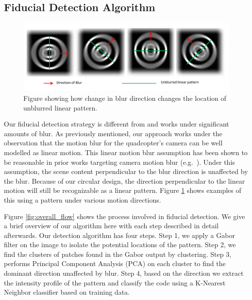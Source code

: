 \documentclass[runningheads]{llncs}
\begin{document}
\subsection{Fiducial Detection Algorithm}

\begin{figure}
\centering
\includegraphics[width=0.8\linewidth]{blur_direction.pdf}
\caption{Figure showing how change in blur direction changes the location of
unblurred linear pattern.}
\label{fig:blur_direction}
\end{figure}

Our fiducial detection strategy is different from \cite{NaimarkF02,Pitag13} and works
under significant amounts of blur.   As previously mentioned, our approach works
under the observation that the motion blur for the quadcopter's camera
can be well modelled as linear motion.  This  linear motion blur assumption has
been shown to be reasonable in prior works targeting camera motion blur
(e.g.~\cite{Moshe:2003,Moshe:2004}). Under this assumption, the scene content
perpendicular to the blur direction is unaffected by the blur.  Because of our
circular design, the direction perpendicular to the linear motion will still be
recognizable as a linear pattern.  Figure \ref{fig:blur_direction} shows
examples of this using a pattern under various motion directions.

Figure \ref{fig:overall_flow} shows the process involved in fiducial
detection. We give a brief overview of our algorithm here with each step described 
in detail afterwards.  Our detection algorithm has four steps. Step 1,
we apply a Gabor filter on the image to isolate the
potential locations of the pattern.  Step 2, we find the clusters of patches
found in the Gabor output by clustering.  Step 3, performs Principal
Component Analysis (PCA) on each cluster to find the dominant direction
unaffected by blur.  Step 4, based on the direction we extract the intensity
profile of the pattern and classify the code using a K-Nearest Neighbor
classifier based on training data.
\end{document}
